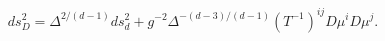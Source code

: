 \begin{equation}
ds_D^2=\Delta^{2/(d-1)}ds_d^2+g^{-2}\Delta^{-(d-3)/(d-1)}(T^{-1})^{ij}
D\mu^iD\mu^j.
\label{eq:metans}
\end{equation}

